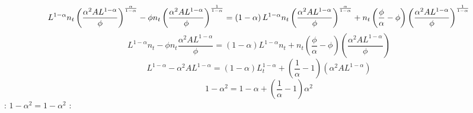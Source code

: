 \documentclass[11pt]{article}
\begin{document}
\begin{equation*}
L^{1-\alpha }n_{t}\left( \frac{\alpha ^{2}AL^{1-\alpha }}{\phi }\right) ^{%
\frac{\alpha }{1-\alpha }}-\phi n_{t}\left( \frac{\alpha ^{2}AL^{1-\alpha }}{%
\phi }\right) ^{\frac{1}{1-\alpha }}=\left( 1-\alpha \right) L^{1-\alpha
}n_{t}\left( \frac{\alpha ^{2}AL^{1-\alpha }}{\phi }\right) ^{\frac{\alpha }{%
1-\alpha }}+n_{t}\left( \frac{\phi }{\alpha }-\phi \right) \left( \frac{%
\alpha ^{2}AL^{1-\alpha }}{\phi }\right) ^{\frac{1}{1-\alpha }}
\end{equation*}%
\begin{equation*}
L^{1-\alpha }n_{t}-\phi n_{t}\frac{\alpha ^{2}AL^{1-\alpha }}{\phi }=\left(
1-\alpha \right) L^{1-\alpha }n_{t}+n_{t}\left( \frac{\phi }{\alpha }-\phi
\right) \left( \frac{\alpha ^{2}AL^{1-\alpha }}{\phi }\right) 
\end{equation*}%
\begin{equation*}
L^{1-\alpha }-\alpha ^{2}AL^{1-\alpha }=\left( 1-\alpha \right)
L_{t}^{1-\alpha }+\left( \frac{1}{\alpha }-1\right) \left( \alpha
^{2}AL^{1-\alpha }\right) 
\end{equation*}%
\begin{equation*}
1-\alpha ^{2}=1-\alpha +\left( \frac{1}{\alpha }-1\right) \alpha ^{2}
\end{equation*}
: $1-\alpha ^{2}=1-\alpha ^{2}$ : 
\end{document}
